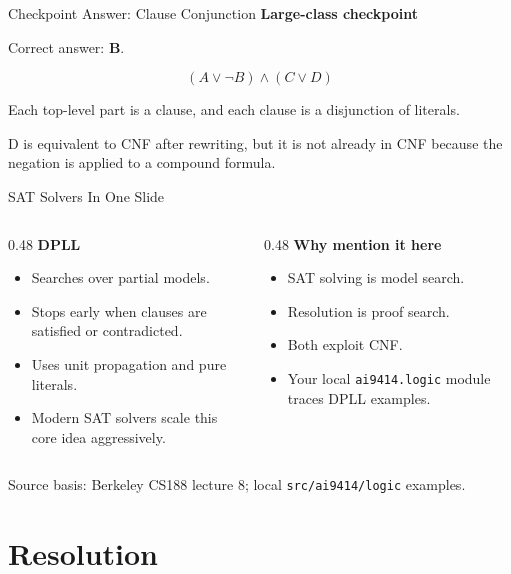 \documentclass[aspectratio=169,11pt]{beamer}
\newcommand{\minihead}[1]{\textbf{\color{unswblue}#1}}
\newcommand{\activity}{\textbf{\color{unsworange}Large-class checkpoint}}
\newcommand{\source}[1]{\vfill{\scriptsize\color{darkgrey}Source basis: #1}}
\begin{document}
\begin{frame}{Checkpoint Answer: Clause Conjunction}
  \activity

  Correct answer: \textbf{B}.

  \[
    (A \lor \neg B) \land (C \lor D)
  \]

  Each top-level part is a clause, and each clause is a disjunction of literals.

  \medskip
  D is equivalent to CNF after rewriting, but it is not already in CNF because the negation is applied to a compound formula.
\end{frame}

\begin{frame}{SAT Solvers In One Slide}
  \begin{columns}[T,onlytextwidth]
    \begin{column}{0.48\textwidth}
      \minihead{DPLL}
      \begin{itemize}
        \item Searches over partial models.
        \item Stops early when clauses are satisfied or contradicted.
        \item Uses unit propagation and pure literals.
        \item Modern SAT solvers scale this core idea aggressively.
      \end{itemize}
    \end{column}
    \begin{column}{0.48\textwidth}
      \minihead{Why mention it here}
      \begin{itemize}
        \item SAT solving is model search.
        \item Resolution is proof search.
        \item Both exploit CNF.
        \item Your local \texttt{ai9414.logic} module traces DPLL examples.
      \end{itemize}
    \end{column}
  \end{columns}

  \source{Berkeley CS188 lecture 8; local \texttt{src/ai9414/logic} examples.}
\end{frame}

\section{Resolution}
\end{document}
